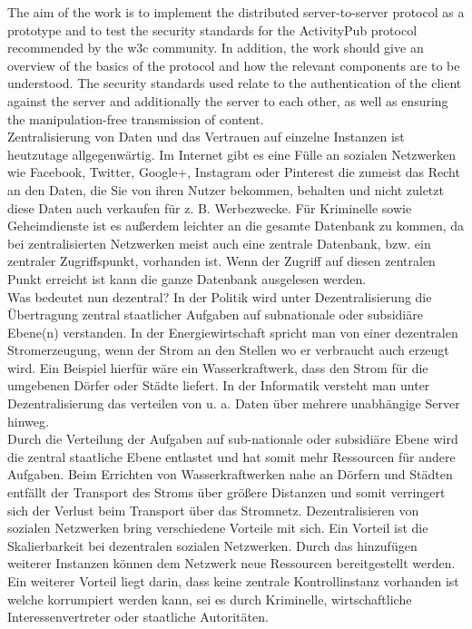 {	%
	The aim of the work is to implement the distributed server-to-server protocol as a prototype and to test the security standards for the ActivityPub protocol recommended by the \gls{w3c} community. In addition, the work should give an overview of the basics of the protocol and how the relevant components are to be understood. The security standards used relate to the authentication of the client against the server and additionally the server to each other, as well as ensuring the manipulation-free transmission of content.\\

}{
	Zentralisierung von Daten und das Vertrauen auf einzelne Instanzen ist heutzutage allgegenwärtig. Im Internet gibt es eine Fülle an sozialen Netzwerken wie Facebook, Twitter, Google+, Instagram oder Pinterest die zumeist das Recht an den Daten, die Sie von ihren Nutzer bekommen, behalten und nicht zuletzt diese Daten auch verkaufen für z. B. Werbezwecke. Für Kriminelle sowie Geheimdienste ist es außerdem leichter an die gesamte Datenbank zu kommen, da bei zentralisierten Netzwerken meist auch eine zentrale Datenbank, bzw. ein zentraler Zugriffspunkt, vorhanden ist. Wenn der Zugriff auf diesen zentralen Punkt erreicht ist kann die ganze Datenbank ausgelesen werden.\\
	
	Was bedeutet nun dezentral? In der Politik wird unter Dezentralisierung \glqq die Übertragung zentral staatlicher Aufgaben auf subnationale oder subsidiäre Ebene(n) verstanden\grqq\cite{wikipedia-dezentralisierung-politik}. In der Energiewirtschaft spricht man von einer \glqq dezentralen Stromerzeugung\grqq, wenn der Strom an den Stellen wo er verbraucht auch erzeugt wird. Ein Beispiel hierfür wäre ein Wasserkraftwerk, dass den Strom für die umgebenen Dörfer oder Städte liefert\cite{wikipedia-dezentralisierung-energie}. In der Informatik versteht man unter Dezentralisierung das verteilen von u. a. Daten über mehrere unabhängige Server hinweg.\\
	
	Durch die Verteilung der Aufgaben auf sub-nationale oder subsidiäre Ebene wird die zentral staatliche Ebene entlastet und hat somit mehr Ressourcen für andere Aufgaben. Beim Errichten von Wasserkraftwerken nahe an Dörfern und Städten entfällt der Transport des Stroms über größere Distanzen und somit verringert sich der Verlust beim Transport über das Stromnetz. Dezentralisieren von sozialen Netzwerken bring verschiedene Vorteile mit sich. Ein Vorteil ist die Skalierbarkeit bei dezentralen sozialen Netzwerken. Durch das hinzufügen weiterer Instanzen können dem Netzwerk neue Ressourcen bereitgestellt werden. Ein weiterer Vorteil liegt darin, dass keine zentrale Kontrollinstanz vorhanden ist welche korrumpiert werden kann, sei es durch Kriminelle, wirtschaftliche Interessenvertreter oder staatliche Autoritäten.\\
	
}
